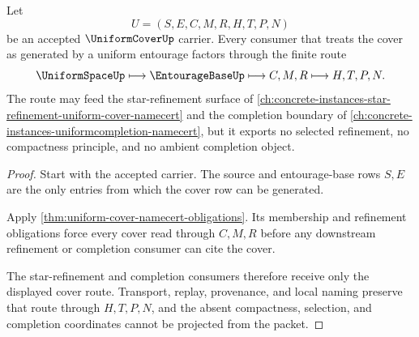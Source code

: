 \begin{theorem}
\label{thm:uniform-cover-entourage-refinement}
Let
$$
U=(S,E,C,M,R,H,T,P,N)
$$
be an accepted $\UniformCoverUp$ carrier. Every consumer that treats the cover as generated by a uniform entourage factors through the finite route
$$
\UniformSpaceUp \longmapsto \EntourageBaseUp \longmapsto C,M,R \longmapsto H,T,P,N .
$$
The route may feed the star-refinement surface of \autoref{ch:concrete-instances-star-refinement-uniform-cover-namecert} and the completion boundary of \autoref{ch:concrete-instances-uniformcompletion-namecert}, but it exports no selected refinement, no compactness principle, and no ambient completion object.
\end{theorem}
\begin{proof}
Start with the accepted carrier. The source and entourage-base rows $S,E$ are the only entries from which the cover row can be generated.

Apply \autoref{thm:uniform-cover-namecert-obligations}. Its membership and refinement obligations force every cover read through $C,M,R$ before any downstream refinement or completion consumer can cite the cover.

The star-refinement and completion consumers therefore receive only the displayed cover route. Transport, replay, provenance, and local naming preserve that route through $H,T,P,N$, and the absent compactness, selection, and completion coordinates cannot be projected from the packet.
\end{proof}




